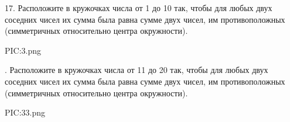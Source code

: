 17. Расположите в кружочках числа от 1 до 10 так, чтобы для любых двух соседних чисел их сумма была равна сумме двух чисел, им противоположных (симметричных относительно центра окружности).
\begin{center}
{{PIC:3.png}}
\end{center}
\newpage
{}. Расположите в кружочках числа от 11 до 20 так, чтобы для любых двух соседних чисел их сумма была равна сумме двух чисел, им противоположных (симметричных относительно центра окружности).
\begin{center}
{{PIC:33.png}}
\end{center}
